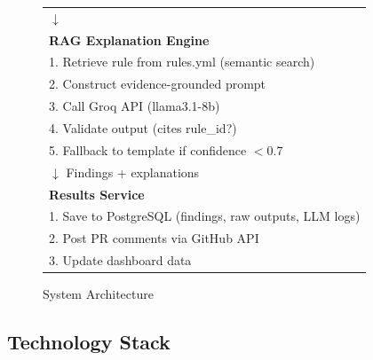 \documentclass[11pt,a4paper]{article}
\begin{document}
\begin{figure}[h]
\begin{tabular}{p{\textwidth}}
$\downarrow$ \\
\textbf{RAG Explanation Engine} \\
1. Retrieve rule from rules.yml (semantic search) \\
2. Construct evidence-grounded prompt \\
3. Call Groq API (llama3.1-8b) \\
4. Validate output (cites rule\_id?) \\
5. Fallback to template if confidence $<$0.7 \\
$\downarrow$ Findings + explanations \\
\textbf{Results Service} \\
1. Save to PostgreSQL (findings, raw outputs, LLM logs) \\
2. Post PR comments via GitHub API \\
3. Update dashboard data \\
\end{tabular}
\caption{System Architecture}
\end{figure}

\subsection{Technology Stack}
\end{document}
